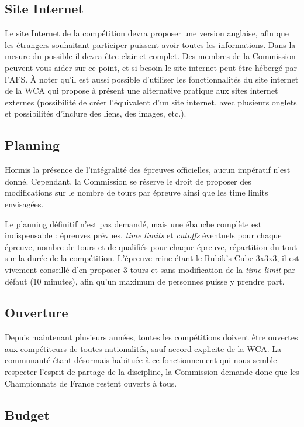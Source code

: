 \documentclass[a4paper,12pt]{scrartcl}
\begin{document}
\subsection*{Site Internet}

Le site Internet de la compétition devra proposer une version anglaise, afin que les étrangers souhaitant participer puissent avoir toutes les informations.
Dans la mesure du possible il devra être clair et complet. Des membres de la Commission peuvent vous aider sur ce point, et si besoin le site internet peut être hébergé par l'AFS. À noter qu'il est aussi possible d'utiliser les fonctionnalités du site internet de la WCA qui propose à présent une alternative pratique aux sites internet externes (possibilité de créer l'équivalent d'un site internet, avec plusieurs onglets et possibilités d'inclure des liens, des images, etc.).


\subsection*{Planning}

Hormis la présence de l'intégralité des épreuves officielles, aucun impératif n'est donné. Cependant, la Commission se réserve le droit de proposer des modifications sur le nombre de tours par épreuve ainsi que les time limits envisagées.

Le planning définitif n'est pas demandé, mais une ébauche complète est indispensable : épreuves prévues, \emph{time limits} et \emph{cutoffs} éventuels pour chaque épreuve, nombre de tours et de qualifiés pour chaque épreuve, répartition du tout sur la durée de la compétition. L'épreuve reine étant le Rubik's Cube 3x3x3, il est vivement conseillé d'en proposer 3 tours et sans modification de la \emph{time limit} par défaut (10 minutes), afin qu'un maximum de personnes puisse y prendre part.


\subsection*{Ouverture}
Depuis maintenant plusieurs années, toutes les compétitions doivent être ouvertes aux compétiteurs de toutes nationalités, sauf accord explicite de la WCA. La communauté étant désormais habituée à ce fonctionnement qui nous semble respecter l'esprit de partage de la discipline, la Commission demande donc que les Championnats de France restent ouverts à tous.


\subsection*{Budget}
\end{document}
